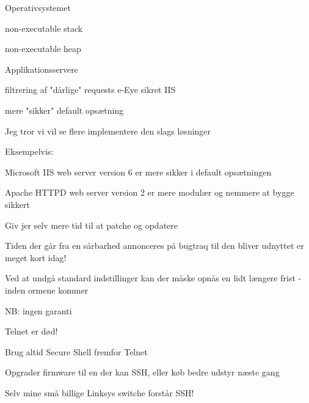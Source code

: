 \begin{list1}
\item Operativsystemet
  \begin{list2}
  \item non-executable stack
  \item non-executable heap
  \end{list2}
\item Applikationsservere
  \begin{list2}
  \item filtrering af "dårlige" requests e-Eye sikret IIS
  \item mere "sikker" default opsætning
  \end{list2}
\item Jeg tror vi vil se flere implementere den slags løsninger
\item Eksempelvis:
\begin{list2}
\item Microsoft IIS web server version 6 er mere sikker i default opsætningen  
\item Apache HTTPD web server version 2 er mere modulær og nemmere at bygge sikkert  
\end{list2}
\end{list1}


\begin{list1}
\item Giv jer selv mere tid til at patche og opdatere
\item Tiden der går fra en sårbarhed annonceres på bugtraq til den bliver
       udnyttet er meget kort idag!
\item Ved at undgå standard indstillinger kan der
       måske opnås en lidt længere frist - inden ormene kommer
\item NB: ingen garanti
\end{list1}




\begin{list1}
\item Telnet er død!
\item Brug altid Secure Shell fremfor Telnet
\item Opgrader firmware til en der kan SSH, eller køb bedre udstyr næste gang
\item Selv mine små billige Linksys switche forstår SSH!
\end{list1}

